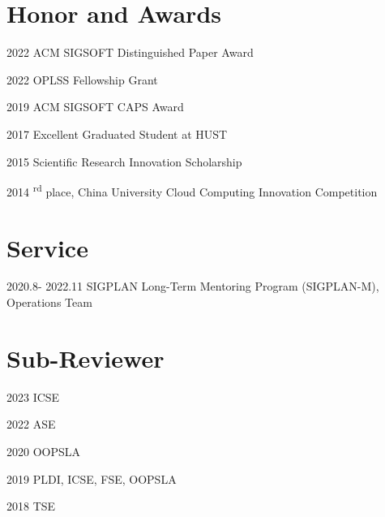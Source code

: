 \documentclass[12pt,letterpaper]{report}
\begin{document}
\vspace{-0.5em}
\section*{Honor and Awards}

\begin{tablist}
	\item[2022] \tab ACM SIGSOFT Distinguished Paper Award
	\item[2022] \tab OPLSS Fellowship Grant
	\item[2019] \tab ACM SIGSOFT CAPS Award
	\item[2017] \tab Excellent Graduated Student at HUST
	\item[2015] \tab Scientific Research Innovation Scholarship
	\item[2014] \textsuperscript{rd} place, China University Cloud Computing Innovation Competition
\end{tablist}


\vspace{-0.5em}
\section*{Service}
\begin{tablist}[style=multiline, leftmargin=*]
	\item[2020.8- 2022.11] \tab SIGPLAN Long-Term Mentoring Program (SIGPLAN-M), Operations Team
\end{tablist}

\section*{Sub-Reviewer}
\begin{tablist}
	\item[2023] \tab ICSE
	\item[2022] \tab ASE
	\item[2020] \tab OOPSLA
	\item[2019] \tab PLDI, ICSE, FSE, OOPSLA
	\item[2018] \tab TSE
\end{tablist}
\end{document}
